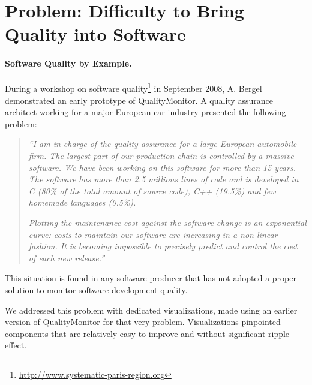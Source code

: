 \documentclass[runningheads]{llncs}
\newcommand{\ie}{\emph{i.e.,}\xspace}
\begin{document}
\section{Problem: Difficulty to Bring Quality into Software}


\paragraph{Software Quality by Example.}
During a workshop on software quality\footnote{\url{http://www.systematic-paris-region.org}} in September 2008, A. Bergel demonstrated an early prototype of QualityMonitor. A quality assurance architect working for a major European car industry presented the following problem:
\begin{quote}
\emph{``I am in charge of the quality assurance for a large European automobile firm. The largest part of our production chain is controlled by a massive software. We have been working on this software for more than 15 years. The software has more than 2.5 millions lines of code and is developed in C (80\% of the total amount of source code), C++ (19.5\%) and few homemade languages (0.5\%).}

\emph{Plotting the maintenance cost against the software change is an exponential curve: costs to maintain our software are increasing in a non linear fashion. It is becoming impossible to precisely predict and control the cost of each new release.''}
\end{quote}

This situation is found in any software producer that has not adopted a proper solution to monitor software development quality.

We addressed this problem with dedicated visualizations, made using an earlier version of QualityMonitor for that very problem. Visualizations pinpointed components that are relatively easy to improve and without significant ripple effect.
\end{document}
